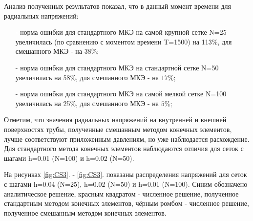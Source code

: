 \documentclass[a4paper,14pt]{extarticle}
\begin{document}
\begin{spacing}{1.0}
\newpage

\begin{comment} 
\begin{table}[h]
\caption{Время решения задачи}
\label{tabl:TimeCS3}
\begin{center}
\begin{tabular}{|c|c|c|}
\hline
h & Стандартный МКЭ & Смешанный МКЭ \\
\hline
0.04 & 0.0365 & 0.1904 \\
\hline
0.02 & 0.0427 &  1.1874 \\
\hline
0.01 & 0.04582 &  8.0546 \\
\hline
\end{tabular}
\end{center}
\end{table}
\end{comment}
\end{spacing}

Анализ полученных результатов показал, что в данный момент времени для радиальных напряжений:
\begin{itemize}
\item[-]норма ошибки для стандартного МКЭ на самой крупной сетке N=25 увеличилась (по сравнению с моментом времени T=1500) на 113$\%$, для смешанного МКЭ - на 38$\%$;
\item[-]норма ошибки для стандартного МКЭ на стандартной сетке N=50 увеличилась на 58$\%$, для смешанного МКЭ - на $17\%$;
\item[-]норма ошибки для стандартного МКЭ на самой мелкой сетке N=100 увеличилась на 25$\%$, для смешанного МКЭ - на $5\%$;
\end{itemize}

Отметим, что значения радиальных напряжений на внутренней и внешней поверхностях трубы, полученные смешанным методом конечных элементов, лучше соответствуют приложенным давлениям, но уже наблюдается расхождение. Для стандартного метода конечных элементов наблюдаются отличия для сеток с шагами h=0.01 (N=100) и h=0.02 (N=50). 

На рисунках \ref{fig:CS3}. - \ref{fig:CS3}. показаны распределения напряжений для сеток с шагами h=0.04 (N=25), h=0.02 (N=50) и h=0.01 (N=100). Синим обозначено аналитическое решение, красным квадратом - численное решение, полученное стандартным методом конечных элементов, чёрным ромбом - численное решение, полученное смешанным методом конечных элементов. 
\end{document}
